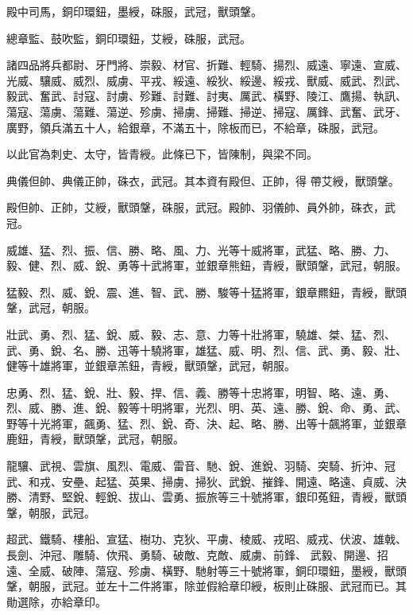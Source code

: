 \begin{pinyinscope}
 殿中司馬，銅印環鈕，墨綬，硃服，武冠，獸頭鞶。



 總章監、鼓吹監，銅印環鈕，艾綬，硃服，武冠。



 諸四品將兵都尉、牙門將、崇毅、材官、折難、輕騎、揚烈、威遠、寧遠、宣威、光威、驤威、威烈、威虜、平戎、綏遠、綏狄、綏邊、綏戎、獸威、威武、烈武、毅武、奮武、討寇、討虜、殄難、討難、討夷、厲武、橫野、陵江、鷹揚、執訊、蕩寇、蕩虜、蕩難、蕩逆、殄虜、掃虜、掃難、掃逆、掃寇、厲鋒、武奮、武牙、廣野，領兵滿五十人，給銀章，不滿五十，除板而已，不給章，硃服，武冠。



 以此官為刺史、太守，皆青綬。此條已下，皆陳制，與梁不同。



 典儀但帥、典儀正帥，硃衣，武冠。其本資有殿但、正帥，得
 帶艾綬，獸頭鞶。



 殿但帥、正帥，艾綬，獸頭鞶，硃服，武冠。殿帥、羽儀帥、員外帥，硃衣，武冠。



 威雄、猛、烈、振、信、勝、略、風、力、光等十威將軍，武猛、略、勝、力、毅、健、烈、威、銳、勇等十武將軍，並銀章熊鈕，青綬，獸頭鞶，武冠，朝服。



 猛毅、烈、威、銳、震、進、智、武、勝、駿等十猛將軍，銀章羆鈕，青綬，獸頭鞶，武冠，朝服。



 壯武、勇、烈、猛、銳、威、毅、志、意、力等十壯將軍，驍雄、桀、猛、烈、武、勇、銳、名、勝、迅等十驍將軍，雄猛、威、明、烈、信、武、勇、毅、壯、健等十雄將軍，並銀章羔鈕，青綬，獸頭鞶，武冠，朝服。



 忠勇、烈、猛、銳、壯、毅、捍、信、義、勝等十忠將軍，明智、略、遠、勇、烈、威、勝、進、銳、毅等十明將軍，光烈、明、英、遠、勝、銳、命、勇、武、野等十光將軍，飆勇、猛、烈、銳、奇、決、起、略、勝、出等十飆將軍，並銀章鹿鈕，青綬，獸頭鞶，武冠，朝服。



 龍驤、武視、雲旗、風烈、電威、雷音、馳、銳、進銳、羽騎、突騎、折沖、冠武、和戎、安壘、起猛、英果、掃虜、掃狄、武銳、摧鋒、開遠、略遠、貞威、決勝、清野、堅銳、輕銳、拔山、雲勇、振旅等三十號將軍，銀印菟鈕，青綬，獸頭鞶，朝服，武冠。



 超武、鐵騎、樓船、宣猛、樹功、克狄、平虜、棱威、戎昭、威戎、伏波、雄戟、長劍、沖冠、雕騎、佽飛、勇騎、破敵、克敵、威虜、前鋒、
 武毅、開邊、招遠、全威、破陣、蕩寇、殄虜、橫野、馳射等三十號將軍，銅印環鈕，墨綬，獸頭鞶，朝服，武冠。並左十二件將軍，除並假給章印綬，板則止硃服、武冠而已。其勛選除，亦給章印。




\end{pinyinscope}
